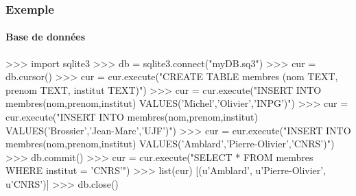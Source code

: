 \begin{frame}[fragile]
\frametitle{Exemple}
\framesubtitle{Base de données}
\begin{pythonConsole}
>>> import sqlite3
>>> db = sqlite3.connect("myDB.sq3")
>>> cur = db.cursor()
>>> cur = cur.execute("CREATE TABLE membres 
    (nom TEXT, prenom TEXT, institut TEXT)")
>>> cur = cur.execute("INSERT INTO membres(nom,prenom,institut) 
    VALUES('Michel','Olivier','INPG')")
>>> cur = cur.execute("INSERT INTO membres(nom,prenom,institut)
    VALUES('Brossier','Jean-Marc','UJF')")
>>> cur = cur.execute("INSERT INTO membres(nom,prenom,institut)
    VALUES('Amblard','Pierre-Olivier','CNRS')")
>>> db.commit()
>>> cur = cur.execute("SELECT * FROM membres WHERE institut = 'CNRS'")
>>> list(cur)
[(u'Amblard', u'Pierre-Olivier', u'CNRS')]
>>> db.close()
\end{pythonConsole}
\end{frame}
